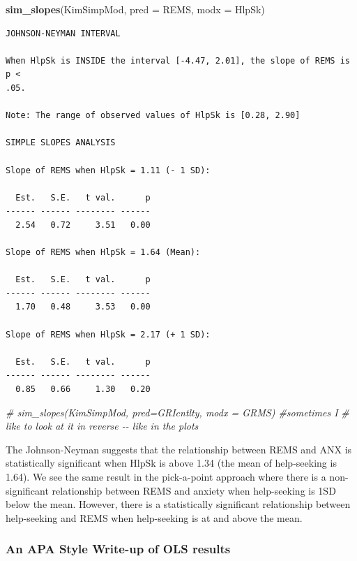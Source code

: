 \documentclass[
  11pt,
]{book}
\newenvironment{Shaded}{\begin{snugshade}}{\end{snugshade}}
\newcommand{\AttributeTok}[1]{\textcolor[rgb]{0.27,0.27,0.27}{#1}}
\newcommand{\CommentTok}[1]{\textcolor[rgb]{0.37,0.37,0.37}{\textit{#1}}}
\newcommand{\FunctionTok}[1]{\textcolor[rgb]{0.27,0.27,0.27}{\textbf{#1}}}
\newcommand{\NormalTok}[1]{#1}
\begin{document}
\begin{Shaded}
\begin{Highlighting}[]
\FunctionTok{sim\_slopes}\NormalTok{(KimSimpMod, }\AttributeTok{pred =}\NormalTok{ REMS, }\AttributeTok{modx =}\NormalTok{ HlpSk)}
\end{Highlighting}
\end{Shaded}

\begin{verbatim}
JOHNSON-NEYMAN INTERVAL 

When HlpSk is INSIDE the interval [-4.47, 2.01], the slope of REMS is p <
.05.

Note: The range of observed values of HlpSk is [0.28, 2.90]

SIMPLE SLOPES ANALYSIS 

Slope of REMS when HlpSk = 1.11 (- 1 SD): 

  Est.   S.E.   t val.      p
------ ------ -------- ------
  2.54   0.72     3.51   0.00

Slope of REMS when HlpSk = 1.64 (Mean): 

  Est.   S.E.   t val.      p
------ ------ -------- ------
  1.70   0.48     3.53   0.00

Slope of REMS when HlpSk = 2.17 (+ 1 SD): 

  Est.   S.E.   t val.      p
------ ------ -------- ------
  0.85   0.66     1.30   0.20
\end{verbatim}

\begin{Shaded}
\begin{Highlighting}[]
\CommentTok{\# sim\_slopes(KimSimpMod, pred=GRIcntlty, modx = GRMS) \#sometimes I}
\CommentTok{\# like to look at it in reverse {-}{-} like in the plots}
\end{Highlighting}
\end{Shaded}

The Johnson-Neyman suggests that the relationship between REMS and ANX is statistically significant when HlpSk is above 1.34 (the mean of help-seeking is 1.64). We see the same result in the pick-a-point approach where there is a non-significant relationship between REMS and anxiety when help-seeking is 1SD below the mean. However, there is a statistically significant relationship between help-seeking and REMS when help-seeking is at and above the mean.

\hypertarget{an-apa-style-write-up-of-ols-results}{%
\subsubsection{An APA Style Write-up of OLS results}\label{an-apa-style-write-up-of-ols-results}}
\end{document}
